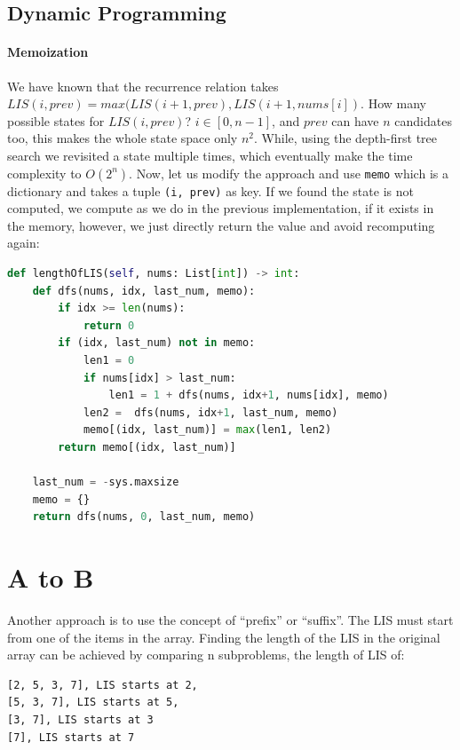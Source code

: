 \documentclass[../main.tex]{subfiles}
\begin{document}
\subsection{Dynamic Programming}
\paragraph{Memoization} We have known that the recurrence relation takes $LIS(i, prev) = max(LIS(i+1, prev), LIS(i+1, nums[i])$. How many possible states for $LIS(i, prev)$? $i \in [0, n-1]$, and $prev$ can have $n$ candidates too, this makes the whole state space only $n^2$. While, using the depth-first tree search we revisited a state multiple times, which eventually make the time complexity to $O(2^n)$. Now, let us modify the approach and use \texttt{memo} which is a dictionary and takes a tuple \texttt{(i, prev)} as key. If we found the state is not computed, we compute as we do in the previous implementation, if it exists in the memory, however, we just directly return the value and avoid recomputing again:
\begin{lstlisting}[language=Python]
def lengthOfLIS(self, nums: List[int]) -> int:
    def dfs(nums, idx, last_num, memo):
        if idx >= len(nums):
            return 0
        if (idx, last_num) not in memo:
            len1 = 0
            if nums[idx] > last_num:
                len1 = 1 + dfs(nums, idx+1, nums[idx], memo)
            len2 =  dfs(nums, idx+1, last_num, memo)
            memo[(idx, last_num)] = max(len1, len2)
        return memo[(idx, last_num)]
    
    last_num = -sys.maxsize
    memo = {}
    return dfs(nums, 0, last_num, memo)
\end{lstlisting}




\section{A to B} Another approach is to use the concept of ``prefix'' or ``suffix''. The LIS must start from one of the items in the array. Finding the length of the LIS in the original array can be achieved by comparing n subproblems, the length of LIS of:
\begin{lstlisting}
[2, 5, 3, 7], LIS starts at 2,
[5, 3, 7], LIS starts at 5, 
[3, 7], LIS starts at 3
[7], LIS starts at 7
\end{lstlisting}
\end{document}
